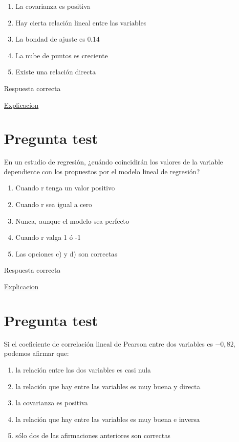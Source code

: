 \documentclass[
]{book}
\providecommand{\tightlist}{%
  \setlength{\itemsep}{0pt}\setlength{\parskip}{0pt}}
\begin{document}
\begin{enumerate}
\def\labelenumi{\alph{enumi})}
\tightlist
\item
  La covarianza es positiva
\item
  Hay cierta relación lineal entre las variables
\item
  La bondad de ajuste es 0.14
\item
  La nube de puntos es creciente
\item
  Existe una relación directa
\end{enumerate}

Respuesta correcta

\href{https://blog.minitab.com/es/analisis-de-regresion-como-puedo-interpretar-el-r-cuadrado-y-evaluar-la-bondad-de-ajuste}{Explicacion}

\hypertarget{pregunta-test-143}{%
\section{Pregunta test}\label{pregunta-test-143}}

En un estudio de regresión, ¿cuándo coincidirán los valores de la variable dependiente con los propuestos por el modelo lineal de regresión?

\begin{enumerate}
\def\labelenumi{\alph{enumi})}
\tightlist
\item
  Cuando r tenga un valor positivo
\item
  Cuando r sea igual a cero
\item
  Nunca, aunque el modelo sea perfecto
\item
  Cuando r valga 1 ó -1
\item
  Las opciones c) y d) son correctas
\end{enumerate}

Respuesta correcta

\href{https://1fjmanzano.github.io/bioestadistica/relaci\%C3\%B3n-entre-variables-nume\%CC\%81ricas.html\#coeficiente-de-correlacio\%CC\%81n}{Explicacion}

\hypertarget{pregunta-test-144}{%
\section{Pregunta test}\label{pregunta-test-144}}

Si el coeficiente de correlación lineal de Pearson entre dos variables es \(-0,82\), podemos afirmar que:

\begin{enumerate}
\def\labelenumi{\alph{enumi})}
\tightlist
\item
  la relación entre las dos variables es casi nula
\item
  la relación que hay entre las variables es muy buena y directa
\item
  la covarianza es positiva
\item
  la relación que hay entre las variables es muy buena e inversa
\item
  sólo dos de las afirmaciones anteriores son correctas
\end{enumerate}
\end{document}
